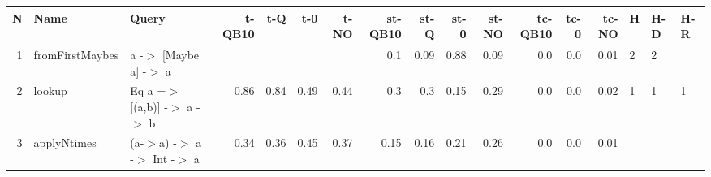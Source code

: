 \begin{tabular}{rll|rrrr|rrrr|rrr|lll} \hline 
N & Name & Query & t-QB10 & t-Q & t-0 & t-NO & st-QB10 & st-Q & st-0 & st-NO & tc-QB10 & tc-0 & tc-NO & H & H-D & H-R \\ 
 \hline 
1 & fromFirstMaybes & a -\ensuremath{>} [Maybe a] -\ensuremath{>} a &  &  &  &  & 0.1 & 0.09 & 0.88 & 0.09 & 0.0 & 0.0 & 0.01 & 2 & 2 &  \\ 
2 & lookup & Eq a =\ensuremath{>} [(a,b)] -\ensuremath{>} a -\ensuremath{>} b & 0.86 & 0.84 & 0.49 & 0.44 & 0.3 & 0.3 & 0.15 & 0.29 & 0.0 & 0.0 & 0.02 & 1 & 1 & 1 \\ 
3 & applyNtimes & (a-\ensuremath{>}a) -\ensuremath{>} a -\ensuremath{>} Int -\ensuremath{>} a & 0.34 & 0.36 & 0.45 & 0.37 & 0.15 & 0.16 & 0.21 & 0.26 & 0.0 & 0.0 & 0.01 &  &  &  \\ 
\hline 
 \end{tabular}